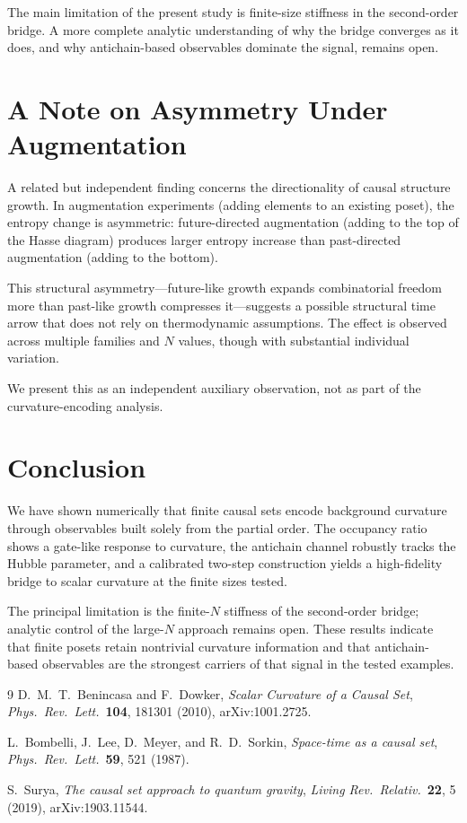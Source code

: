 \documentclass[12pt,a4paper]{article}
\begin{document}
The main limitation of the present study is finite-size stiffness in the
second-order bridge. A more complete analytic understanding of why the bridge
converges as it does, and why antichain-based observables dominate the signal,
remains open.

\section{A Note on Asymmetry Under Augmentation}

A related but independent finding concerns the directionality of causal
structure growth.
In augmentation experiments (adding elements to an existing poset), the entropy
change is asymmetric: future-directed augmentation (adding to the top of the
Hasse diagram) produces larger entropy increase than past-directed augmentation
(adding to the bottom).

This structural asymmetry---future-like growth expands combinatorial freedom
more than past-like growth compresses it---suggests a possible structural time
arrow that does not rely on thermodynamic assumptions.
The effect is observed across multiple families and $N$ values, though with
substantial individual variation.

We present this as an independent auxiliary observation, not as part of the
curvature-encoding analysis.

\section{Conclusion}

We have shown numerically that finite causal sets encode background curvature
through observables built solely from the partial order. The occupancy ratio
shows a gate-like response to curvature, the antichain channel robustly tracks
the Hubble parameter, and a calibrated two-step construction yields a
high-fidelity bridge to scalar curvature at the finite sizes tested.

The principal limitation is the finite-$N$ stiffness of the second-order
bridge; analytic control of the large-$N$ approach remains open. These results
indicate that finite posets retain nontrivial curvature information and that
antichain-based observables are the strongest carriers of that signal in the
tested examples.

\begin{thebibliography}{9}
D.~M.~T.~Benincasa and F.~Dowker,
\emph{Scalar Curvature of a Causal Set},
\emph{Phys.\ Rev.\ Lett.}\ \textbf{104}, 181301 (2010),
arXiv:1001.2725.

L.~Bombelli, J.~Lee, D.~Meyer, and R.~D.~Sorkin,
\emph{Space-time as a causal set},
\emph{Phys.\ Rev.\ Lett.}\ \textbf{59}, 521 (1987).

S.~Surya,
\emph{The causal set approach to quantum gravity},
\emph{Living Rev.\ Relativ.}\ \textbf{22}, 5 (2019),
arXiv:1903.11544.
\end{thebibliography}
\end{document}
